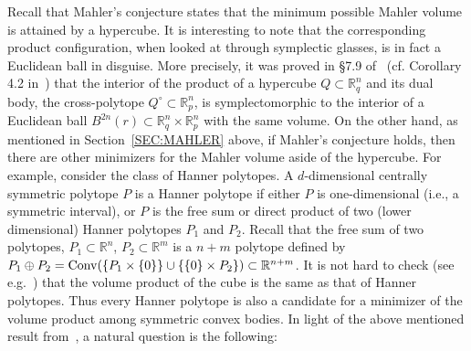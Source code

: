 \documentclass{icmart}
\theoremstyle{definition}
\begin{document}
Recall that Mahler's conjecture states that the minimum possible Mahler volume is attained by a hypercube. 
It is interesting to note that the corresponding product configuration, when looked at through symplectic glasses,  is in fact a Euclidean ball in disguise. More precisely, it was proved in \S 7.9 of~\cite{Schle} (cf. Corollary 4.2 in~\cite{LMS})  that the interior of the product of a hypercube $Q \subset {\mathbb R}^n_q$ and its dual body, the cross-polytope $Q^{\circ} \subset {\mathbb R}^n_p$, is symplectomorphic to the interior of a Euclidean ball $B^{2n}(r)  \subset {\mathbb R}^n_q \times  {\mathbb R}^n_p$ with the same volume.
On the other hand, as mentioned in Section~\ref{SEC:MAHLER} above, if Mahler's conjecture holds, then there are other minimizers for the Mahler volume  aside of the hypercube. 
For example, consider the class of Hanner polytopes. A $d$-dimensional centrally symmetric polytope $P$ is
a Hanner polytope if either $P$ is one-dimensional (i.e., a symmetric interval), or $P$ 
is the free sum or direct product of two (lower dimensional) Hanner
polytopes $P_1$ and $P_2$.
Recall that the free sum of two polytopes, $P_1 \subset {\mathbb R}^n$, $P_2 \subset {\mathbb R}^m$ is  a $n+m$ polytope defined by $P_1 \oplus P_2 = {\rm Conv} ( \{ P_1 \times \{0\} \}  \cup \{  \{0\} \times P_2 \}) \subset {\mathbb R}^{n+m}$. 
It is not hard to check (see e.g.~\cite{SR}) that  the volume product of the cube is the same as that of Hanner polytopes. Thus every Hanner polytope is also a candidate for a minimizer of the volume
product among symmetric convex bodies. In light of the above mentioned result from~\cite{Schle}, a natural question is the following: %
%
%
%
\end{document}
